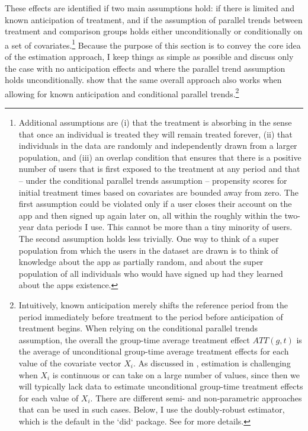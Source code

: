 These effects are identified if two main assumptions hold: if there is limited
and known anticipation of treatment, and if the assumption of parallel trends
between treatment and comparison groups holds either unconditionally or
conditionally on a set of covariates.\footnote{Additional assumptions are (i)
    that the treatment is absorbing in the sense that once an individual is
    treated they will remain treated forever, (ii) that individuals in the data
    are randomly and independently drawn from a larger population, and (iii) an
    overlap condition that ensures that there is a positive number of users
    that is first exposed to the treatment at any period and that -- under the
    conditional parallel trends assumption -- propensity scores for initial
    treatment times based on covariates are bounded away from zero. The first
    assumption could be violated only if a user closes their account on the app
    and then signed up again later on, all within the roughly within the
    two-year data periods I use. This cannot be more than a tiny minority of
    users.  The second assumption holds less trivially. One way to think of a
    super population from which the users in the dataset are drawn is to think
    of knowledge about the app as partially random, and about the super
    population of all individuals who would have signed up had they learned
    about the apps existence.} Because the purpose of this section is to convey
    the core idea of the estimation approach, I keep things as simple as
    possible and discuss only the case with no anticipation effects and where
    the parallel trend assumption holds unconditionally.
    \citet{callaway2021difference} show that the same overall approach also
    works when allowing for known anticipation and conditional parallel
    trends.\footnote{Intuitively, known anticipation merely shifts the
        reference period from the period immediately before treatment to the
        period before anticipation of treatment begins. When relying on the
        conditional parallel trends assumption, the overall the group-time
        average treatment effect $ATT(g, t)$ is the average of unconditional
        group-time average treatment effects for each value of the covariate
        vector $X_i$.  As discussed in \citet{roth2022trending}, estimation is
        challenging when $X_i$ is continuous or can take on a large number of
        values, since then we will typically lack data to estimate
        unconditional group-time treatment effects for each value of $X_i$.
        There are different semi- and non-parametric approaches that can be
        used in such cases. Below, I use the doubly-robust estimator, which is
    the default in the `did` package. See \citet{callaway2021difference,
roth2022trending} for more details.}

